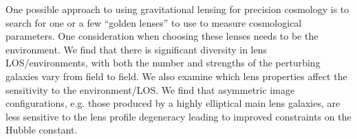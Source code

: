 One possible approach to using gravitational lensing for precision cosmology is to search for one or a few ``golden lenses'' to use to measure cosmological parameters. One consideration when choosing these lenses needs to be the environment. We find that there is significant diversity in lens LOS/environments, with both the number and strengths of the perturbing galaxies vary from field to field.  We also examine which lens properties affect the sensitivity to the environment/LOS. We find that asymmetric image configurations, e.g. those produced by a highly elliptical main lens galaxies, are less sensitive to the lens profile degeneracy leading to improved constraints on the Hubble constant.
